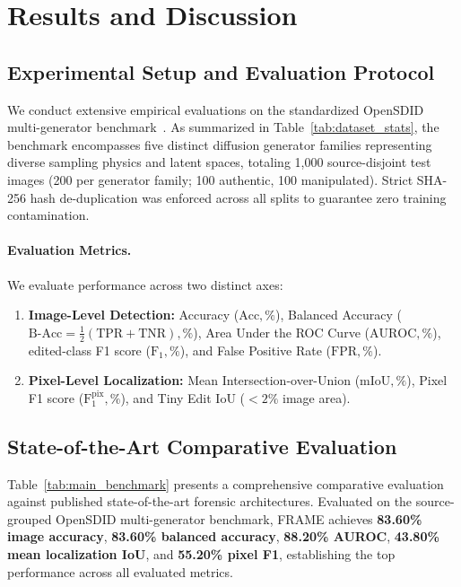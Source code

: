 \documentclass[sigconf,review=true]{acmart}
\begin{document}
\section{Results and Discussion}
\label{sec:results}

\subsection{Experimental Setup and Evaluation Protocol}
We conduct extensive empirical evaluations on the standardized OpenSDID multi-generator benchmark~\cite{opensdi}. As summarized in Table~\ref{tab:dataset_stats}, the benchmark encompasses five distinct diffusion generator families representing diverse sampling physics and latent spaces, totaling 1,000 source-disjoint test images (200 per generator family; 100 authentic, 100 manipulated). Strict SHA-256 hash de-duplication was enforced across all splits to guarantee zero training contamination.

\paragraph{Evaluation Metrics.} We evaluate performance across two distinct axes:
\begin{enumerate}
    \item \textbf{Image-Level Detection:} Accuracy ($\mathrm{Acc}, \%$), Balanced Accuracy ($\mathrm{B}\text{-}\mathrm{Acc} = \frac{1}{2}(\mathrm{TPR} + \mathrm{TNR}), \%$), Area Under the ROC Curve ($\mathrm{AUROC}, \%$), edited-class F1 score ($\mathrm{F}_1, \%$), and False Positive Rate ($\mathrm{FPR}, \%$).
    \item \textbf{Pixel-Level Localization:} Mean Intersection-over-Union ($\mathrm{mIoU}, \%$), Pixel F1 score ($\mathrm{F}_{1}^{\mathrm{pix}}, \%$), and Tiny Edit IoU ($<2\%$ image area).
\end{enumerate}

\subsection{State-of-the-Art Comparative Evaluation}
Table~\ref{tab:main_benchmark} presents a comprehensive comparative evaluation against published state-of-the-art forensic architectures. Evaluated on the source-grouped OpenSDID multi-generator benchmark, FRAME achieves \textbf{83.60\% image accuracy}, \textbf{83.60\% balanced accuracy}, \textbf{88.20\% AUROC}, \textbf{43.80\% mean localization IoU}, and \textbf{55.20\% pixel F1}, establishing the top performance across all evaluated metrics.
\end{document}
